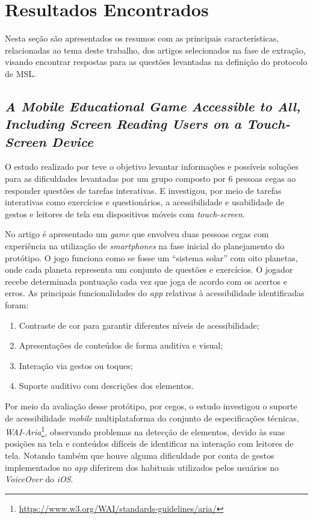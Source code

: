 \newpage{}

\section{Resultados Encontrados}

Nesta seção são apresentados os resumos com as principais características, relacionadas ao tema deste trabalho, dos artigos selecionados na fase de extração, visando encontrar respostas para as questões levantadas na definição do protocolo de MSL\@.

\subsection{\emph{A Mobile Educational Game Accessible to All, Including Screen Reading Users on a Touch-Screen Device}}

O estudo realizado por  teve o objetivo levantar informações e possíveis soluções para as dificuldades levantadas por um grupo composto por 6 pessoas cegas ao responder questões de tarefas interativas.
E investigou, por meio de tarefas interativas como exercícios e questionários, a acessibilidade e usabilidade de gestos e leitores de tela em dispositivos móveis com \emph{touch-screen}.

No artigo é apresentado um \emph{game} que envolveu duas pessoas cegas com experiência na utilização de \emph{smartphones} na fase inicial do planejamento do protótipo.
O jogo funciona como se fosse um ``sistema solar'' com oito planetas, onde cada planeta representa um conjunto de questões e exercícios.
O jogador recebe determinada pontuação cada vez que joga de acordo com os acertos e erros.
As principais funcionalidades do \emph{app} relativas à acessibilidade identificadas foram:

\begin{enumerate}
    \item Contraste de cor para garantir diferentes níveis de acessibilidade;
    \item Apresentações de conteúdos de forma auditiva e visual;
    \item Interação via gestos ou toques;
    \item Suporte auditivo com descrições dos elementos.
\end{enumerate}

Por meio da avaliação desse protótipo, por cegos, o estudo investigou o suporte de acessibilidade \emph{mobile} multiplataforma do conjunto de especificações
técnicas, \emph{WAI-Aria}\footnote{\url{https://www.w3.org/WAI/standards-guidelines/aria/}}, observando problemas na detecção de elementos, devido às suas posições
na tela e conteúdos difíceis de identificar na interação com leitores de tela.
Notando também que houve alguma dificuldade por conta de gestos implementados no \emph{app} diferirem dos habituais utilizados pelos usuários no \emph{VoiceOver} do \emph{iOS}.

